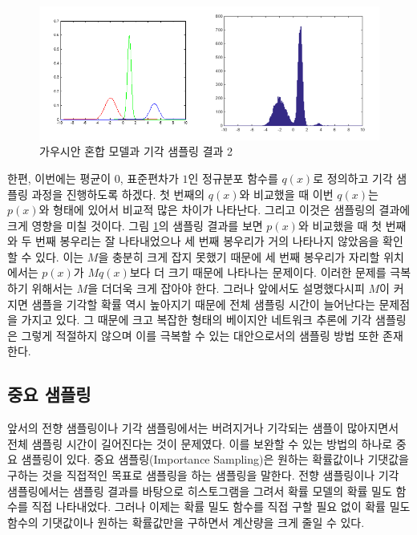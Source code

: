 \documentclass[a4paper]{oblivoir}
\begin{document}
\begin{figure}[ht] \centering 
\includegraphics[scale=0.8]{fig10_6.png} 
\caption{가우시안 혼합 모델과 기각 샘플링 결과 2}
\label{fig:10-6}
\end{figure}  

한편, 이번에는 평균이 $0$, 표준편차가 $1$인 정규분포 함수를 $q(x)$로 정의하고 기각 샘플링 과정을 진행하도록 하겠다. 첫 번째의 $q(x)$와 비교했을 때 이번 $q(x)$는 $p(x)$와 형태에 있어서 비교적 많은 차이가 나타난다. 그리고 이것은 샘플링의 결과에 크게 영향을 미칠 것이다. 그림 \ref{fig:10-6}의 샘플링 결과를 보면 $p(x)$와 비교했을 때 첫 번째와 두 번째 봉우리는 잘 나타내었으나 세 번째 봉우리가 거의 나타나지 않았음을 확인할 수 있다. 이는 $M$을 충분히 크게 잡지 못했기 때문에 세 번째 봉우리가 자리할 위치에서는 $p(x)$가 $Mq(x)$보다 더 크기 때문에 나타나는 문제이다. 이러한 문제를 극복하기 위해서는 $M$을 더더욱 크게 잡아야 한다. 그러나 앞에서도 설명했다시피 $M$이 커지면 샘플을 기각할 확률 역시 높아지기 때문에 전체 샘플링 시간이 늘어난다는 문제점을 가지고 있다. 그 때문에 크고 복잡한 형태의 베이지안 네트워크 추론에 기각 샘플링은 그렇게 적절하지 않으며 이를 극복할 수 있는 대안으로서의 샘플링 방법 또한 존재한다. 

\subsection{중요 샘플링}

앞서의 전향 샘플링이나 기각 샘플링에서는 버려지거나 기각되는 샘플이 많아지면서 전체 샘플링 시간이 길어진다는 것이 문제였다. 이를 보완할 수 있는 방법의 하나로 중요 샘플링이 있다. 중요 샘플링(Importance Sampling)은 원하는 확률값이나 기댓값을 구하는 것을 직접적인 목표로 샘플링을 하는 샘플링을 말한다. 전향 샘플링이나 기각 샘플링에서는 샘플링 결과를 바탕으로 히스토그램을 그려서 확률 모델의 확률 밀도 함수를 직접 나타내었다. 그러나 이제는 확률 밀도 함수를 직접 구할 필요 없이 확률 밀도 함수의 기댓값이나 원하는 확률값만을 구하면서 계산량을 크게 줄일 수 있다. \\
\end{document}
